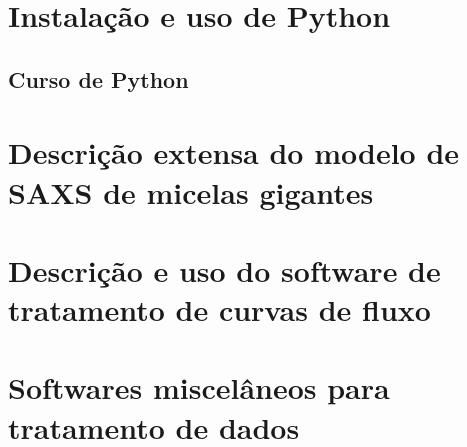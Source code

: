 \begin{apendicesenv}
	\partapendices
	\chapter{Instalação e uso de Python}
		\section{Curso de Python}
	\chapter{Descrição extensa do modelo de SAXS de micelas gigantes}
	\chapter{Descrição e uso do software de tratamento de curvas de fluxo}
	\chapter{Softwares miscelâneos para tratamento de dados}
\end{apendicesenv}

%
%
%
%
%
%
%
